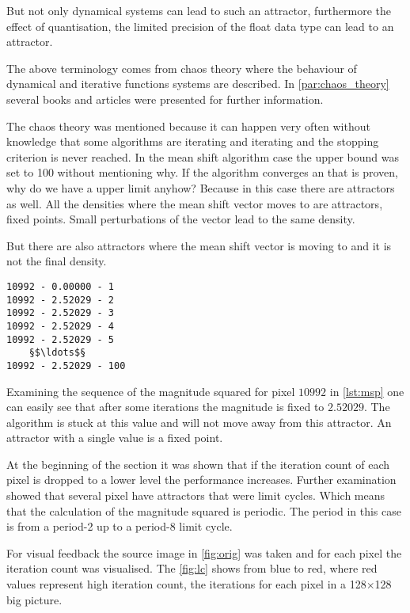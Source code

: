 But not only dynamical systems can lead to such an attractor, furthermore the 
effect of quantisation, the limited precision of the float data type can lead to
an attractor. 

The above terminology comes from chaos theory where the behaviour of dynamical
and iterative functions systems are described. In \autoref{par:chaos_theory} 
several books and articles were presented for further information. 

The chaos theory was mentioned because it can happen very often without knowledge
that some algorithms are iterating and iterating and the stopping criterion is never
reached. In the mean shift algorithm case the upper bound was set to 100 without
mentioning why. If the algorithm converges an that is proven, why do we have a 
upper limit anyhow? Because in this case there are attractors as well. All the 
densities where the mean shift vector moves to are attractors, fixed points.
Small perturbations of the vector lead to the same density. 

But there are also attractors where the mean shift vector is moving to and it is
not the final density. 

\begin{lstlisting}[caption=Magnitude squared of pixel 10992, label=lst:msp]
10992 - 0.00000 - 1
10992 - 2.52029 - 2
10992 - 2.52029 - 3
10992 - 2.52029 - 4
10992 - 2.52029 - 5
	§$\ldots$§
10992 - 2.52029 - 100
\end{lstlisting}
Examining the sequence of the magnitude squared for pixel $10992$ in
\autoref{lst:msp} one can easily see that after some iterations the magnitude is
fixed to $2.52029$. The algorithm is stuck at this value and will not move away
from this attractor. An attractor with a single value is a fixed point. 

At the beginning of the section it was shown that if the iteration count of each
pixel is dropped to a lower level the performance increases. Further examination
showed that several pixel have attractors that were limit cycles. Which means that
the calculation of the magnitude squared is periodic. The period in this case
is from a period-2 up to a period-8 limit cycle.

For visual feedback the source image in \autoref{fig:orig} was taken and for
each pixel the iteration count was visualised. The \autoref{fig:lc} shows
from blue to red, where red values represent high iteration count, the iterations
for each pixel in a 128$\times$128 big picture.


